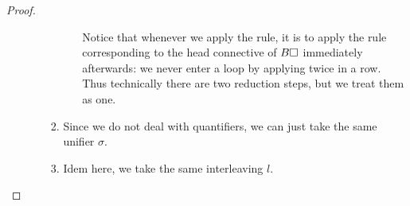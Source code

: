 \begin{scope}
\begin{proof}
\begin{enumerate}[itemsep=0.8em]
\begin{itemize}
\begin{enumerate}[itemsep=0.4em]
\begin{itemize}
          Notice that whenever we apply the {} rule, it is to apply
          the rule corresponding to the head connective of $B\square$ immediately
          afterwards: we never enter a loop by applying {} twice in
          a row. Thus technically there are two reduction steps, but we treat
          them as one.
        \end{itemize}
        
        

        \item Since we do not deal with quantifiers, we can just take the same
        unifier $\sigma$.

        \item Idem here, we take the same interleaving $l$.
      \end{enumerate}
    \end{itemize} 
  \end{enumerate}
\end{proof}



\end{scope}
